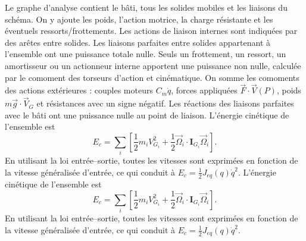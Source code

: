 \begin{corrigebox}
Le graphe d'analyse contient le bâti, tous les solides
                mobiles et les liaisons du schéma. On y ajoute les poids, l'action motrice,
                la charge résistante et les éventuels ressorts/frottements. Les actions de
                liaison internes sont indiquées par des arêtes entre solides.
Les liaisons parfaites entre solides appartenant à
                l'ensemble ont une puissance totale nulle. Seuls un frottement, un ressort,
                un amortisseur ou un actionneur interne apportent une puissance non nulle,
                calculée par le comoment des torseurs d'action et cinématique.
On somme les comoments des actions extérieures :
                couples moteurs $C_m\dot q$, forces appliquées $\vec F\cdot\vec V(P)$,
                poids $m\vec g\cdot\vec V_G$ et résistances avec un signe négatif. Les
                réactions des liaisons parfaites avec le bâti ont une puissance nulle au
                point de liaison.
L'énergie cinétique de l'ensemble est
                \[E_c=\sum_i\left[\frac12m_iV_{G_i}^2+
                \frac12\vec\Omega_i\cdot\mathbf I_{G_i}\vec\Omega_i\right].\]
                En utilisant la loi entrée--sortie, toutes les vitesses sont exprimées en
                fonction de la vitesse généralisée d'entrée, ce qui conduit à
                $E_c=\tfrac12J_{eq}(q)\dot q^2$.
L'énergie cinétique de l'ensemble est
                \[E_c=\sum_i\left[\frac12m_iV_{G_i}^2+
                \frac12\vec\Omega_i\cdot\mathbf I_{G_i}\vec\Omega_i\right].\]
                En utilisant la loi entrée--sortie, toutes les vitesses sont exprimées en
                fonction de la vitesse généralisée d'entrée, ce qui conduit à
                $E_c=\tfrac12J_{eq}(q)\dot q^2$.
\end{corrigebox}

